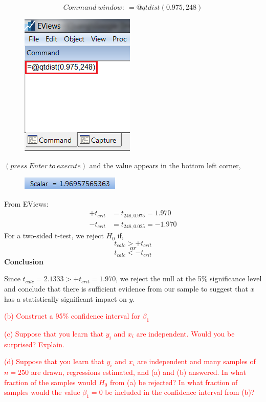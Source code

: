 \documentclass[12pt]{report}
\begin{document}
$$Command\ window:\ =@qtdist(0.975,248)$$
\begin{figure}[H]
	\centering
	\includegraphics{tute6_q2_2}
\end{figure}
\vspace{-\baselineskip}\centering $(press\ Enter\ to\ execute)$
\justify and the value appears in the bottom left corner,
\begin{figure}[H]
	\centering
	\includegraphics{tute6_q2_3}
\end{figure}
\vspace{-\baselineskip}
\noindent From EViews: \begin{align*}
+t_{crit} &= t_{248,0.975} = 1.970 \\
-t_{crit} &= t_{248,0.025} = -1.970
\end{align*}
\noindent For a two-sided t-test, we reject $H_0$ if,
$$t_{calc} > +t_{crit}$$
$$or$$
$$t_{calc} < -t_{crit}$$
\noindent \textbf{Conclusion}

\noindent Since $t_{calc} = 2.1333 > +t_{crit} = 1.970$, we reject the null at the 5\% significance level and conclude that there is sufficient evidence from our sample to suggest that $x$ has a statistically significant impact on $y$.

\newpage
\noindent \textcolor{red}{(b) Construct a 95\% confidence interval for $\beta_1$}
\vspace{40mm}

\noindent \textcolor{red}{(c) Suppose that you learn that $y_i$ and $x_i$ are independent. Would you be surprised? Explain.}
\vspace{60mm}

\noindent \textcolor{red}{(d) Suppose that you learn that $y_i$ and $x_i$ are independent and many samples of $n=250$ are drawn, regressions estimated, and (a) and (b) answered. In what fraction of the samples would $H_0$ from (a) be rejected? In what fraction of samples would the value $\beta_1 = 0$ be included in the confidence interval from (b)?}
\end{document}
